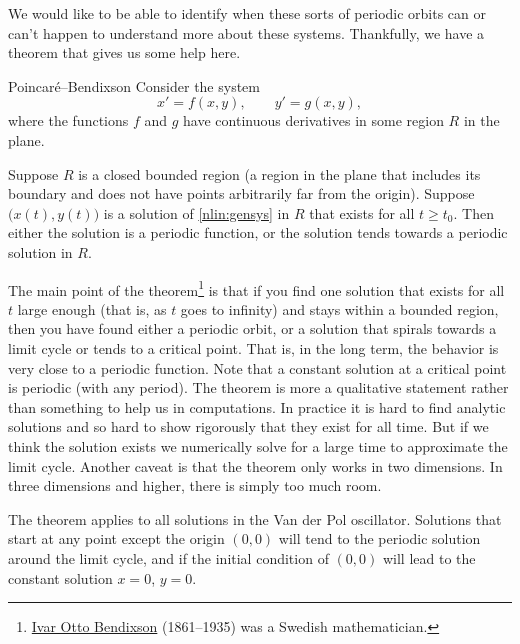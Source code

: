 We would like to be able to identify when these sorts of periodic orbits can or can't happen to understand more about these systems. Thankfully, we have a theorem that gives us some help here. 


\begin{theorem1}{Poincar\'e--Bendixson}
Consider the system
\begin{equation} \label{nlin:gensys}
x' = f(x,y), \qquad y' = g(x,y) ,
\end{equation}
where the functions $f$ and $g$ have continuous derivatives in some region
$R$ in the plane. 

Suppose $R$ is a closed bounded region (a region in the plane that includes
its boundary and does not have points arbitrarily far from the origin).
Suppose $\bigl(x(t), y(t)\bigr)$ is a solution of
\eqref{nlin:gensys} in $R$ that exists
for all $t \geq t_0$.  Then either the solution is a periodic function,
or the solution tends towards a periodic solution in $R$.
\end{theorem1}

The main point of the theorem\footnote{%
\href{https://en.wikipedia.org/wiki/Ivar_Otto_Bendixson}{Ivar Otto Bendixson}
(1861--1935) was a Swedish mathematician.}%
is that if you find one solution that exists
for all $t$ large enough (that is, as $t$ goes to infinity) and stays
within a bounded region, then
you have found either a periodic orbit, or a solution that spirals towards a
limit cycle or tends to a critical point.
That is, in the long term, the
behavior is very close to a periodic function.
Note that a constant solution at a critical point is periodic (with
any period).
The theorem is more a qualitative statement rather than
something to help us in computations.  In practice it is hard to find
analytic solutions and so hard to show rigorously that they exist for all
time.
But if we think the solution exists we numerically solve for a
large time to approximate the limit cycle.
Another caveat is that the theorem only works in two
dimensions.  In three dimensions and higher, there is simply too much room.

The theorem applies to all solutions in the Van der Pol oscillator.
Solutions that start at any point except the origin $(0,0)$ will tend to the
periodic solution around the limit cycle, and if the initial condition
of $(0,0)$ will lead to the constant solution $x=0$, $y=0$.

